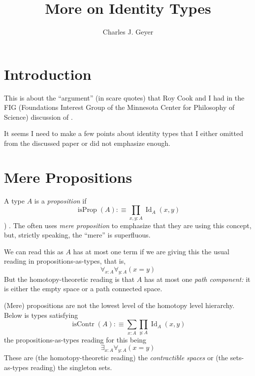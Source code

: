 \documentclass[11pt]{article}
\DeclareMathOperator{\iscontr}{isContr}
\DeclareMathOperator{\isprop}{isProp}
\DeclareMathOperator{\idtype}{Id}
\begin{document}
\title{More on Identity Types}

\author{Charles J. Geyer}

\maketitle

\section{Introduction}

This is about the ``argument'' (in scare quotes) that Roy Cook and I had
in the FIG (Foundations Interest Group of the Minnesota Center for Philosophy
of Science) discussion of \citet{geyer-survey}.

It seems I need to make a few points about identity types that I either omitted
from the discussed paper or did not emphasize enough.

\section{Mere Propositions}

A type $A$ is a \emph{proposition} if
\begin{equation} \label{eq:isProp}
  \isprop(A) :\equiv \prod_{x, y : A} \idtype_A(x, y) 
\end{equation}
\citep[Definition~3.3.1 in][hereinafter referred to as the
HoTT book]{hott-book}) \citep[Section~8.3]{geyer-survey}.
The  often uses \emph{mere proposition} to emphasize that
they are using this concept, but, strictly speaking, the ``mere'' is
superfluous.

We can read this as $A$ has at most one term if we are giving this the usual
reading in propositions-as-types, that is,
$$
   \forall_{x : A} \forall_{y : A} (x = y)
$$
But the homotopy-theoretic reading is that $A$ has at most one
\emph{path component:} it is either the empty space or a path connected space.

(Mere) propositions are not the lowest level of the homotopy level hierarchy.
Below is types satisfying
\begin{equation} \label{eq:isContr}
   \iscontr(A) :\equiv \sum_{x : A} \prod_{y : A} \idtype_A(x, y)
\end{equation}
the propositions-as-types reading for this being
$$
   \exists_{x : A} \forall_{y : A} (x = y)
$$
These are (the homotopy-theoretic reading) the \emph{contractible spaces}
or (the sets-as-types reading) the singleton sets.
\end{document}
